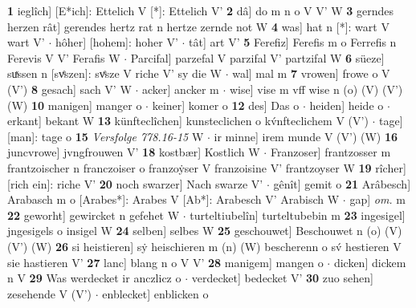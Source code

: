 \documentclass[8pt,a4paper,notitlepage]{article}
\begin{document}
\begin{table}[ht]
\begin{minipage}[t]{0.5\linewidth}
\textbf{1} ieglîch] [E*ich]: Ettelich V [*]: Ettelich V' \textbf{2} dâ] do m n o V V' W \textbf{3} gerndes herzen rât] gerendes hertz rat n hertze zernde not W \textbf{4} was] hat n [*]: wart V wart V'  $\cdot$ hôher] [hohem]: hoher V'  $\cdot$ tât] art V' \textbf{5} Ferefiz] Ferefis m o Ferrefis n Ferevis V V' Ferafis W  $\cdot$ Parcifal] parzefal V parzifal V' partzifal W \textbf{6} süeze] suͯssen n [svͤszen]: svͤsze V riche V' sy die W  $\cdot$ wal] mal m \textbf{7} vrowen] frowe o V (V') \textbf{8} gesach] sach V' W  $\cdot$ acker] ancker m  $\cdot$ wise] vise m vff wise n (o) (V) (V') (W) \textbf{10} manigen] manger o  $\cdot$ keiner] komer o \textbf{12} des] Das o  $\cdot$ heiden] heide o  $\cdot$ erkant] bekant W \textbf{13} künfteclîchen] kunsteclichen o kv́nfteclichem V (V')  $\cdot$ tage] [man]: tage o \textbf{15} \textit{Versfolge 778.16-15} W   $\cdot$ ir minne] irem munde V (V') (W) \textbf{16} juncvrowe] jvngfrouwen V' \textbf{18} kostbær] Kostlich W  $\cdot$ Franzoser] frantzosser m frantzoischer n franczoiser o franzoẏser V franzoisine V' frantzoyser W \textbf{19} rîcher] [rich ein]: riche V' \textbf{20} noch swarzer] Nach swarze V'  $\cdot$ gênît] gemit o \textbf{21} Arâbesch] Arabasch m o [Arabes*]: Arabes V [Ab*]: Arabesch V' Arabisch W  $\cdot$ gap] \textit{om.} m \textbf{22} geworht] gewircket n gefehet W  $\cdot$ turteltiubelîn] turteltubebin m \textbf{23} ingesigel] jngesigels o insigel W \textbf{24} selben] selbes W \textbf{25} geschouwet] Beschouwet n (o) (V) (V') (W) \textbf{26} si heistieren] sẏ heischieren m (n) (W) bescherenn o sv́ hestieren V sie hastieren V' \textbf{27} lanc] blang n o V V' \textbf{28} manigem] mangen o  $\cdot$ dicken] dickem n V \textbf{29} Was werdecket ir anczlicz o  $\cdot$ verdecket] bedecket V' \textbf{30} zuo sehen] zesehende V (V')  $\cdot$ enblecket] enblicken o \newline
\end{minipage}
\end{table}
\newpage
\end{document}
